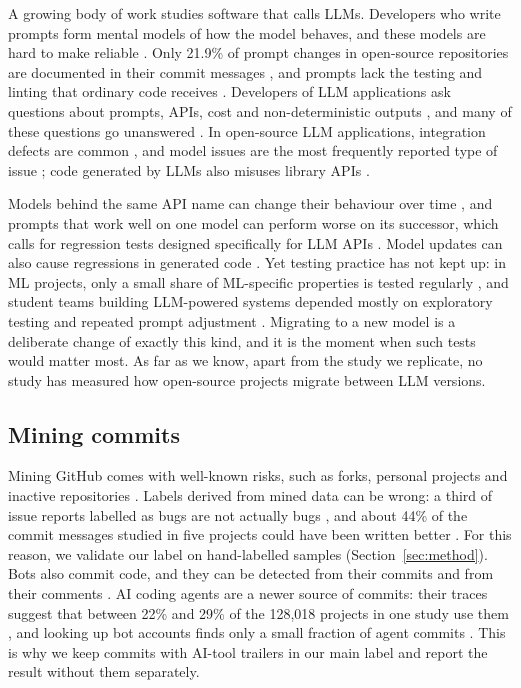 A growing body of work studies software that calls LLMs. Developers who write prompts form mental models of how the model behaves, and these models are hard to make reliable \citep{liang2025prompts}. Only 21.9\% of prompt changes in open-source repositories are documented in their commit messages \citep{tafreshipour2025prompting}, and prompts lack the testing and linting that ordinary code receives \citep{pister2024promptset}. Developers of LLM applications ask questions about prompts, APIs, cost and non-deterministic outputs \citep{chen2025llmdev,chen2026openaiso}, and many of these questions go unanswered \citep{alam2024challenges}. In open-source LLM applications, integration defects are common \citep{shao2025integrated}, and model issues are the most frequently reported type of issue \citep{cai2025llmissues}; code generated by LLMs also misuses library APIs \citep{zhuo2026apimisuse}.

Models behind the same API name can change their behaviour over time \citep{chen2024chatgpt}, and prompts that work well on one model can perform worse on its successor, which calls for regression tests designed specifically for LLM APIs \citep{ma2024prompt}. Model updates can also cause regressions in generated code \citep{abbassi2025recatcher}. Yet testing practice has not kept up: in ML projects, only a small share of ML-specific properties is tested regularly \citep{openja2025testingml}, and student teams building LLM-powered systems depended mostly on exploratory testing and repeated prompt adjustment \citep{magalhaes2025untestable}. Migrating to a new model is a deliberate change of exactly this kind, and it is the moment when such tests would matter most. As far as we know, apart from the study we replicate, no study has measured how open-source projects migrate between LLM versions.

\subsection{Mining commits}

Mining GitHub comes with well-known risks, such as forks, personal projects and inactive repositories \citep{kalliamvakou2014perils}. Labels derived from mined data can be wrong: a third of issue reports labelled as bugs are not actually bugs \citep{herzig2013bug}, and about 44\% of the commit messages studied in five projects could have been written better \citep{tian2022commit}. For this reason, we validate our label on hand-labelled samples (Section~\ref{sec:method}). Bots also commit code, and they can be detected from their commits \citep{dey2020bots} and from their comments \citep{golzadeh2021bots}. AI coding agents are a newer source of commits: their traces suggest that between 22\% and 29\% of the 128,018 projects in one study use them \citep{robbes2026agentic}, and looking up bot accounts finds only a small fraction of agent commits \citep{khosravani2026agents}. This is why we keep commits with AI-tool trailers in our main label and report the result without them separately.

